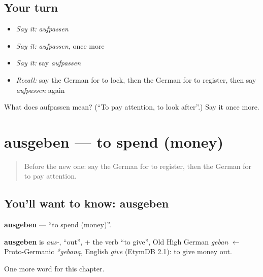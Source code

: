 \subsection*{Your turn}
\begin{itemize}
\raggedright
  \item \emph{Say it:} \emph{aufpassen}
  \item \emph{Say it:} \emph{aufpassen}, once more
  \item \emph{Say it:} say \emph{aufpassen}
  \item \emph{Recall:} say the German for to lock, then the German for to register, then say \emph{aufpassen} again
\end{itemize}

\begin{tcolorbox}[breakable,colback=teal!4,colframe=teal!35!black,title={Before you move on}]
What does aufpassen mean? (\textquotedblleft{}To pay attention, to look after\textquotedblright{}.) Say it once more.
\end{tcolorbox}
\section[ausgeben]{ausgeben — to spend (money)}

\label{lesson:GE-C245-ausgeben}



\begin{quote}
Before the new one: say the German for to register, then the German for to pay attention.
\end{quote}

\subsection*{You'll want to know: ausgeben}
\textbf{ausgeben} — \textquotedblleft{}to spend (money)\textquotedblright{}.

\begin{cousinweb}
\textbf{ausgeben} is \emph{aus-}, \textquotedblleft{}out\textquotedblright{}, + the verb \textquotedblleft{}to give\textquotedblright{}, Old High German \emph{geban} $\leftarrow$ Proto-Germanic \emph{*gebaną}, English \emph{give} (EtymDB 2.1): to give money out.
\end{cousinweb}

\begin{grammarlens}[title={What you've built}]
One more word for this chapter.
\end{grammarlens}

